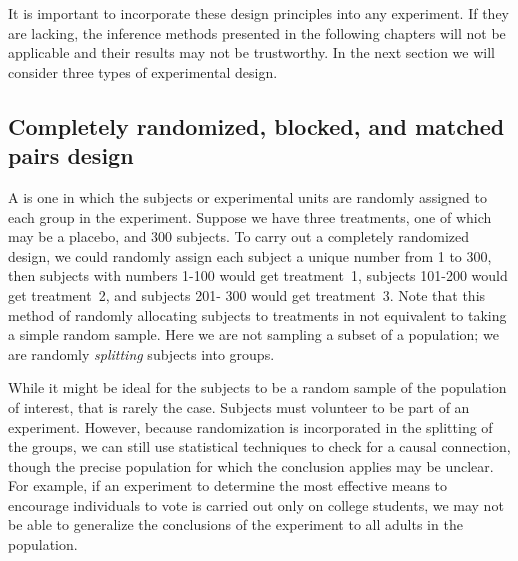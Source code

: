 It is important to incorporate these design principles into any experiment. If they are lacking, the inference methods presented in the following chapters will not be applicable and their results may not be trustworthy. In the next section we will consider three types of experimental design.


\subsection{Completely randomized, blocked, and matched pairs design}
\label{CompletelyRandomizedBlockedAndMatchedPairsDesign}


A  is one in which the subjects or experimental units are randomly assigned to each group in the experiment. Suppose we have three treatments, one of which may be a placebo, and 300 subjects. To carry out a completely randomized design, we could randomly assign each subject a unique number from 1 to 300, then subjects with numbers 1-100 would get treatment~1, subjects 101-200 would get treatment~2, and subjects 201- 300 would get treatment~3. Note that this method of randomly allocating subjects to treatments in not equivalent to taking a simple random sample. Here we are not sampling a subset of a population; we are randomly \emph{splitting} subjects into groups.


While it might be ideal for the subjects to be a random sample of the population of interest, that is rarely the case. Subjects must volunteer to be part of an experiment. However, because randomization is incorporated in the splitting of the groups, we can still use statistical techniques to check for a causal connection, though the precise population for which the conclusion applies may be unclear. For example, if an experiment to determine the most effective means to encourage individuals to vote is carried out only on college students, we may not be able to generalize the conclusions of the experiment to all adults in the population.

